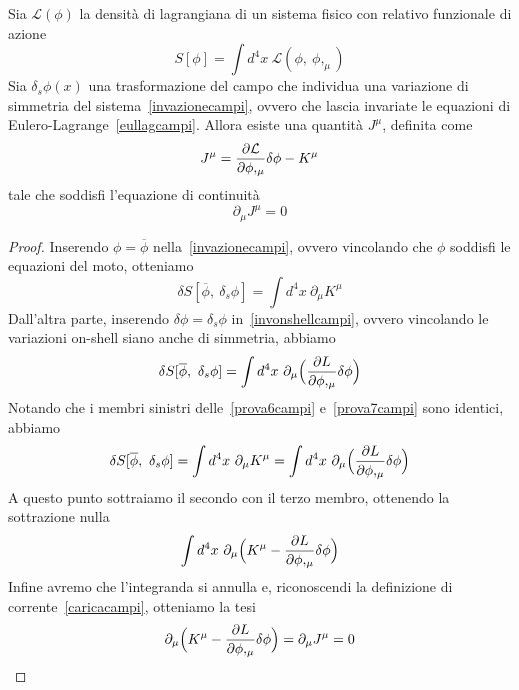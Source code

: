     \begin{theorem}
        Sia $\mathcal L(\phi)$ la densità di lagrangiana di un sistema fisico con relativo funzionale di azione
    \begin{equation*}
        S[\phi] = \int d^4 x ~ \mathcal L(\phi,~\phi,_\mu)
    \end{equation*}
        Sia $\delta_s \phi(x)$ una trasformazione del campo che individua una variazione di simmetria del sistema~\eqref{invazionecampi}, ovvero che lascia invariate le equazioni di Eulero-Lagrange~\eqref{eullagcampi}. Allora esiste una quantità $J^\mu$, definita come
    \begin{equation}\label{caricacampi}
        J^\mu = \frac{\partial\mathcal L}{\partial\phi,_\mu} \delta \phi - K^\mu 
    \end{equation}
        tale che soddisfi l'equazione di continuità
    \begin{equation} \label{thcampi}
        \partial_\mu J^\mu = 0
    \end{equation}
    \end{theorem}

    \begin{proof}
        Inserendo $\phi = \overline \phi$ nella~\eqref{invazionecampi}, ovvero vincolando che $\phi$ soddisfi le equazioni del moto, otteniamo 
    \begin{equation}\label{prova6campi}
        \delta S[\overline \phi, ~\delta_s \phi] = \int d^4 x ~ \partial_\mu K^\mu
    \end{equation}
        Dall'altra parte, inserendo $\delta \phi = \delta_s \phi$ in~\eqref{invonshellcampi}, ovvero vincolando le variazioni on-shell siano anche di simmetria, abbiamo
    \begin{equation}\label{prova7campi}
        \delta S[\overline \phi,~\delta_s \phi] = \int d^4 x ~ \partial_\mu \Big ( \frac{\partial L}{\partial\phi,_\mu}  \delta \phi \Big)
    \end{equation}
        Notando che i membri sinistri delle~\eqref{prova6campi} e~\eqref{prova7campi} sono identici, abbiamo
    \begin{equation}
        \delta S[\overline \phi, ~\delta_s \phi] = \int d^4 x~ \partial_\mu K^\mu = \int d^4 x ~ \partial_\mu \Big ( \frac{\partial L}{\partial\phi,_\mu}  \delta \phi \Big)
    \end{equation}
        A questo punto sottraiamo il secondo con il terzo membro, ottenendo la sottrazione nulla
    \begin{equation}
        \int d^4 x ~ \partial_\mu \Big ( K^\mu - \frac{\partial L}{\partial\phi,_\mu} \delta \phi \Big)
    \end{equation}
        Infine avremo che l'integranda si annulla e, riconoscendi la definizione di corrente~\eqref{caricacampi}, otteniamo la tesi
    \begin{equation}
        \partial_\mu \Big ( K^\mu - \frac{\partial L}{\partial\phi,_\mu}  \delta \phi \Big) = \partial_\mu J^\mu = 0
    \end{equation}
    \end{proof}

